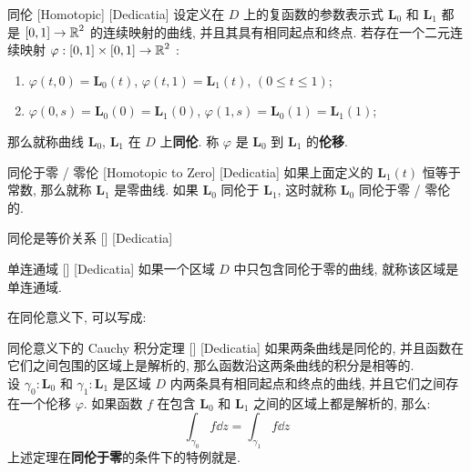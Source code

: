         \begin{dfn}
            [Homotopic]
            {同伦}
            [Homotopic]
            [Dedicatia]
            设定义在 \(D\) 上的复函数的参数表示式 \(\bm{L}_0\) 和 \(\bm{L}_1\) 都是 \([0,1]\to\operatorname{\mathbb{R}}^2\) 的连续映射的曲线, 并且其具有相同起点和终点. 若存在一个二元连续映射 \(\varphi:[0,1]\times[0,1]\to\operatorname{\mathbb{R}}^2\) :
            \begin{enumerate}
                \item  \(\varphi(t,0)=\bm{L}_0(t)\),  \(\varphi(t,1)=\bm{L}_1(t)\),  \((0\leq t\leq 1)\);
                \item  \(\varphi(0,s)=\bm{L}_0(0)=\bm{L}_1(0)\),  \(\varphi(1,s)=\bm{L}_0(1)=\bm{L}_1(1)\);
            \end{enumerate}
            那么就称曲线 \(\bm{L}_0\),  \(\bm{L}_1\) 在 \(D\) 上\textbf{同伦}. 称 \(\varphi\) 是 \(\bm{L}_0\) 到 \(\bm{L}_1\) 的\textbf{伦移}. 
        \end{dfn}

        \begin{dfn}
            {同伦于零 / 零伦}
            [Homotopic to Zero]
            [Dedicatia]
            如果上面定义的 \(\bm{L}_1(t)\) 恒等于常数, 那么就称 \(\bm{L}_1\) 是零曲线. 如果 \(\bm{L}_0\) 同伦于 \(\bm{L}_1\), 这时就称 \(\bm{L}_0\) 同伦于零 / 零伦的. 
        \end{dfn}

        \begin{ppt}
            {同伦是等价关系}
            []
            [Dedicatia]
        \end{ppt}
        
        \begin{dfn}
            {单连通域}
            []
            [Dedicatia]
            如果一个区域 \(D\) 中只包含同伦于零的曲线, 就称该区域是单连通域. 
        \end{dfn}

        在同伦意义下, \CauchyThm 可以写成: 

        \begin{thm}
            {同伦意义下的 Cauchy 积分定理}
            []
            [Dedicatia]
            如果两条曲线是同伦的, 并且函数在它们之间包围的区域上是解析的, 那么函数沿这两条曲线的积分是相等的. \\
            设  \(\gamma_0:\bm{L}_0\)  和  \(\gamma_1:\bm{L}_1\)  是区域  \(D\)  内两条具有相同起点和终点的曲线, 并且它们之间存在一个伦移  \(\varphi\). 如果函数 \(f\) 在包含 \(\bm{L}_0\) 和 \(\bm{L}_1\) 之间的区域上都是解析的, 那么: 
            \[\int_{\gamma_0}f\dd{z}=\int_{\gamma_1}f\dd{z}\]
            上述定理在\textbf{同伦于零}的条件下的特例就是\CauchyThm.
        \end{thm}

